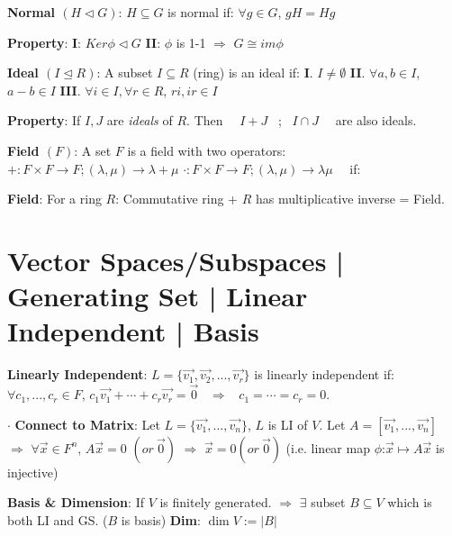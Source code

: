 \documentclass[9pt]{article}
\begin{document}
\textbf{Normal $(H\lhd G)$}: {\small $H\subseteq G$ is normal if: $\forall g\in G$, $gH=Hg$} 

\qquad \textbf{Property}: \textbf{I}: $Ker\phi\lhd G$ \quad \textbf{II}: $\phi$ is 1-1 $\Rightarrow$ $G\cong im\phi$

\textbf{Ideal $(I\trianglelefteq R)$}: A subset $I\subseteq R$ (ring) is an ideal if: \quad \textbf{I}. $I\ne\emptyset$ \quad \textbf{II}. $\forall a,b\in I$, $a-b\in I$ \quad \textbf{III}. $\forall i\in I,\forall r\in R$, $ri,ir\in I$

\qquad \textbf{Property}: If $I,J$ are \textit{ideals} of $R$. Then \ \ $I+J$ \ ; \ $I\cap J$ \ \ are also ideals.

\textbf{Field $(F)$}: {\small A set $F$ is a field with two operators: $+:F\times F\to F;(\lambda,\mu)\to\lambda+\mu$ $\cdot:F\times F\to F;(\lambda,\mu)\to\lambda\mu$ \ \ if:}

\quad \quad \quad {}

\qquad \qquad  \textbf{Field}: For a ring $R$: Commutative ring + $R$ has multiplicative inverse = Field.


\section{Vector Spaces/Subspaces | Generating Set | Linear Independent | Basis} %

\textbf{Linearly Independent}: $L=\{\vec{v_1},\vec{v_2},...,\vec{v_r}\}$ is linearly independent if: \ $\forall c_1,...,c_r\in F$, $c_1\vec{v_1}+\cdots+c_r\vec{v_r}=\vec{0}$ \ $\Rightarrow$ \ $c_1=\cdots =c_r=0$.

$\cdot$ \textbf{Connect to Matrix}: {\footnotesize Let $L=\{\vec{v_1},...,\vec{v_n}\}$, $L$ is LI of $V$. Let $A=[\vec{v_1},...,\vec{v_n}]$ $\Rightarrow$ $\forall\vec{x}\in F^n$, $A\vec{x}=0$ $(or \ \vec{0})$ $\Rightarrow$ $\vec{x}=0 (or \ \vec{0})$ (i.e. linear map $\phi$:$\vec{x}\mapsto A\vec{x}$ is injective)}

\textbf{Basis \& Dimension}: If $V$ is finitely generated. $\Rightarrow$ $\exists$ subset $B\subseteq V$ which is both LI and GS. ($B$ is basis) \quad \textbf{Dim}: $\dim V:=|B|$
\end{document}
